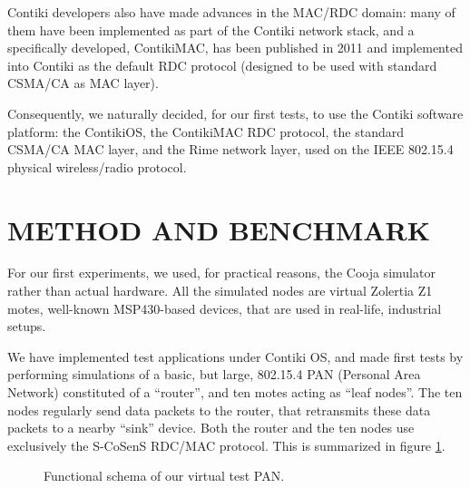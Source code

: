 \documentclass[a4paper,twoside]{article}
\begin{document}
Contiki developers also have made advances in the MAC/RDC domain: many
of them have been implemented as part of the Contiki network stack, and
a specifically developed, ContikiMAC, has been published in 2011
\cite{ContikiMAC} and implemented into Contiki as the default
RDC protocol (designed to be used with standard CSMA/CA as MAC layer).

\medskip

Consequently, we naturally decided, for our first tests, to use the Contiki
software platform: the ContikiOS, the ContikiMAC RDC protocol, the standard
CSMA/CA MAC layer, and the Rime network layer, used on the IEEE 802.15.4
physical wireless/radio protocol.



\section{\uppercase{Method and Benchmark}}

For our first experiments, we used, for practical reasons, the Cooja
simulator rather than actual hardware. All the simulated nodes are
virtual Zolertia Z1 motes, well-known MSP430-based devices, that are
used in real-life, industrial setups.

We have implemented test applications under Contiki OS, and made first tests
by performing simulations of a basic, but large, 802.15.4 PAN (Personal Area
Network) constituted of a ``router'', and ten motes acting as ``leaf nodes''.
The ten nodes regularly send data packets to the router, that retransmits
these data packets to a nearby ``sink'' device. Both the router and the ten
nodes use exclusively the S-CoSenS RDC/MAC protocol. This is summarized
in figure \ref{FigPANtest}.

\begin{figure}[!h]
\centering
{}
\caption{Functional schema of our virtual test PAN.}
\label{FigPANtest}
\end{figure}
\end{document}
